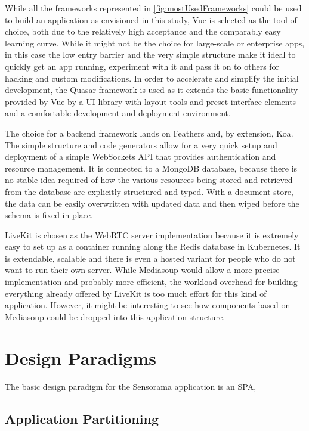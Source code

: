 While all the frameworks represented in \autoref{fig:mostUsedFrameworks} could be used to build an application as envisioned in this study, Vue is selected as the tool of choice, both due to the relatively high acceptance and the comparably easy learning curve. While it might not be the choice for large-scale or enterprise apps, in this case the low entry barrier and the very simple structure make it ideal to quickly get an app running, experiment with it and pass it on to others for hacking and custom modifications. In order to accelerate and simplify the initial development, the Quasar framework is used as it extends the basic functionality provided by Vue by a \ac{UI} library with layout tools and preset interface elements and a comfortable development and deployment environment.

The choice for a backend framework lands on Feathers and, by extension, Koa. The simple structure and code generators allow for a very quick setup and deployment of a simple WebSockets \ac{API} that provides authentication and resource management. It is connected to a MongoDB database, because there is no stable idea required of how the various resources being stored and retrieved from the database are explicitly structured and typed. With a document store, the data can be easily overwritten with updated data and then wiped before the schema is fixed in place.

LiveKit is chosen as the WebRTC server implementation because it is extremely easy to set up as a container running along the Redis database in Kubernetes. It is extendable, scalable and there is even a hosted variant for people who do not want to run their own server. While Mediasoup would allow a more precise implementation and probably more efficient, the workload overhead for building everything already offered by LiveKit is too much effort for this kind of application. However, it might be interesting to see how components based on Mediasoup could be dropped into this application structure.

\section{Design Paradigms}

The basic design paradigm for the Sensorama application is an \ac{SPA}, 

\subsection{Application Partitioning}


